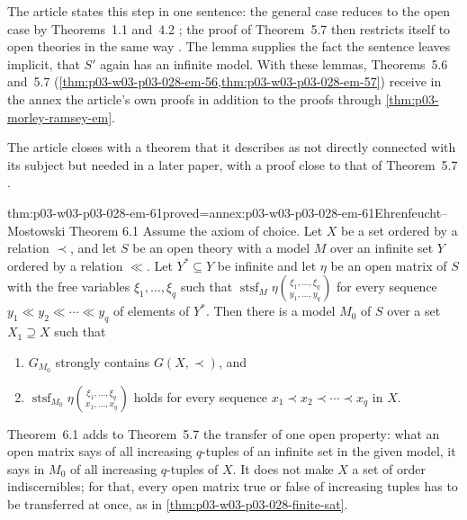 The article states this step in one sentence: the general case reduces to the
open case by Theorems~1.1 and~4.2 \cite[p.~62]{EhrenfeuchtMostowski1956}; the
proof of Theorem~5.7 then restricts itself to open theories in the same way
\cite[p.~63]{EhrenfeuchtMostowski1956}.  The lemma supplies the fact the
sentence leaves implicit, that \(S'\) again has an infinite model.  With these
lemmas, Theorems~5.6 and~5.7
(\cref{thm:p03-w03-p03-028-em-56,thm:p03-w03-p03-028-em-57}) receive in the
annex the article's own proofs in addition to the proofs through
\cref{thm:p03-morley-ramsey-em}.

The article closes with a theorem that it describes as not directly connected
with its subject but needed in a later paper, with a proof close to that of
Theorem~5.7 \cite[pp.~66--67]{EhrenfeuchtMostowski1956}.

\begin{hbtheorem}{thm:p03-w03-p03-028-em-61}{proved=annex:p03-w03-p03-028-em-61}{Ehrenfeucht--Mostowski Theorem 6.1}
Assume the axiom of choice.  Let \(X\) be a set ordered by a relation
\(\prec\), and let \(S\) be an open theory with a model \(M\) over an infinite
set \(Y\) ordered by a relation \(\ll\).  Let \(Y^*\subseteq Y\) be infinite
and let \(\eta\) be an open matrix of \(S\) with the free variables
\(\xi_1,\ldots,\xi_q\) such that
\(\operatorname{stsf}_M\eta\binom{\xi_1,\ldots,\xi_q}{y_1,\ldots,y_q}\) for every
sequence \(y_1\ll y_2\ll\cdots\ll y_q\) of elements of \(Y^*\).  Then there is a
model \(M_0\) of \(S\) over a set \(X_1\supseteq X\) such that
\cite[Theorem~6.1, p.~67, proof pp.~67--68]{EhrenfeuchtMostowski1956}
\begin{enumerate}
\item[(6.1.1)] \(G_{M_0}\) strongly contains \(G(X,\prec)\), and
\item[(6.1.2)] \(\operatorname{stsf}_{M_0}\eta\binom{\xi_1,\ldots,\xi_q}{x_1,\ldots,x_q}\)
holds for every sequence \(x_1\prec x_2\prec\cdots\prec x_q\) in \(X\).
\end{enumerate}
\end{hbtheorem}

Theorem~6.1 adds to Theorem~5.7 the transfer of one open property: what an
open matrix says of all increasing \(q\)-tuples of an infinite set in the
given model, it says in \(M_0\) of all increasing \(q\)-tuples of \(X\).  It
does not make \(X\) a set of order indiscernibles; for that, every open
matrix true or false of increasing tuples has to be transferred at once, as
in \cref{thm:p03-w03-p03-028-finite-sat}.

